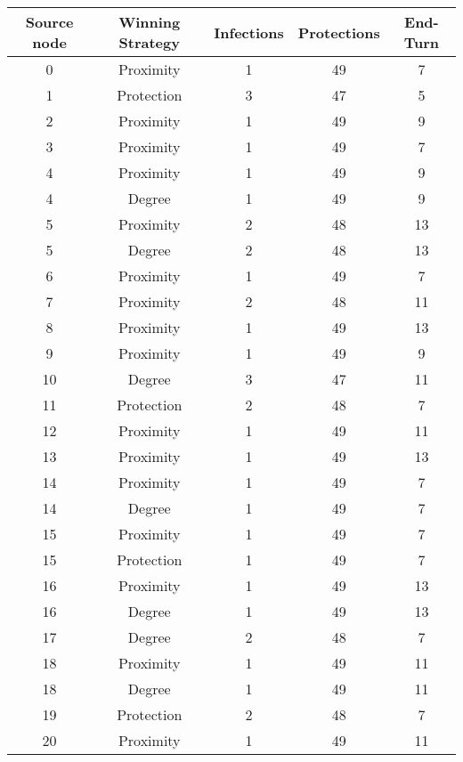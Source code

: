 \documentclass[results.tex]{subfiles}
\begin{document}
\begin{center}
  \begin{tabular}{| c || c | c | c | c |}
    \hline
    {\bfseries Source node} & {\bfseries Winning Strategy} & {\bfseries Infections} & {\bfseries Protections} & {\bfseries End-Turn} \\  %
    \hline\hline
    0 & Proximity & 1 & 49 & 7 \\ 
    \hline
    1 & Protection & 3 & 47 & 5 \\ 
    \hline
    2 & Proximity & 1 & 49 & 9 \\ 
    \hline
    3 & Proximity & 1 & 49 & 7 \\ 
    \hline
    4 & Proximity & 1 & 49 & 9 \\ 
    \hline
    4 & Degree & 1 & 49 & 9 \\ 
    \hline
    5 & Proximity & 2 & 48 & 13 \\ 
    \hline
    5 & Degree & 2 & 48 & 13 \\ 
    \hline
    6 & Proximity & 1 & 49 & 7 \\ 
    \hline
    7 & Proximity & 2 & 48 & 11 \\ 
    \hline
    8 & Proximity & 1 & 49 & 13 \\ 
    \hline
    9 & Proximity & 1 & 49 & 9 \\ 
    \hline
    10 & Degree & 3 & 47 & 11 \\ 
    \hline
    11 & Protection & 2 & 48 & 7 \\ 
    \hline
    12 & Proximity & 1 & 49 & 11 \\ 
    \hline
    13 & Proximity & 1 & 49 & 13 \\ 
    \hline
    14 & Proximity & 1 & 49 & 7 \\ 
    \hline
    14 & Degree & 1 & 49 & 7 \\ 
    \hline
    15 & Proximity & 1 & 49 & 7 \\ 
    \hline
    15 & Protection & 1 & 49 & 7 \\ 
    \hline
    16 & Proximity & 1 & 49 & 13 \\ 
    \hline
    16 & Degree & 1 & 49 & 13 \\ 
    \hline
    17 & Degree & 2 & 48 & 7 \\ 
    \hline
    18 & Proximity & 1 & 49 & 11 \\ 
    \hline
    18 & Degree & 1 & 49 & 11 \\ 
    \hline
    19 & Protection & 2 & 48 & 7 \\ 
    \hline
    20 & Proximity & 1 & 49 & 11 \\ 

\end{tabular}
\end{center}
\end{document}
